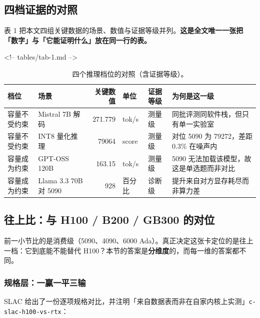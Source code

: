 \subsection{四档证据的对照}

表 1 把本文四组关键数据的场景、数值与证据等级并列。\textbf{这是全文唯一一张把「数字」与「它能证明什么」放在同一行的表。}


<!-- tables/tab-1.md -->

\begin{table}[t]
\centering
\footnotesize
\setlength{\tabcolsep}{4pt}
\caption{四个推理档位的对照（含证据等级）。}
\label{tab:6}
\begin{tabularx}{\textwidth}{llrllX}
\toprule
档位 & 场景 & 关键数值 & 单位 & 证据等级 & 为何是这一级 \\
\midrule
容量不受约束 & Mistral 7B 解码 & 271.779 & tok/s & 测量级 & 同批评测同软件栈，但只有单一实验室 \\
容量不受约束 & INT8 量化推理 & 79064 & score & 测量级 & 对位 5090 为 79272，差距 0.3\% 在噪声内 \\
容量成为约束 & GPT-OSS 120B & 163.15 & tok/s & 测量级 & 5090 无法加载该模型，故这是单选题而非对比 \\
容量成为约束 & Llama 3.3 70B 对 5090 & 928 & 百分比 & 诊断级 & 提升来自对方显存耗尽而非算力差 \\
\bottomrule
\end{tabularx}
\end{table}


\subsection{往上比：与 H100 / B200 / GB300 的对位}

前一小节比的是消费级（5090、4090、6000 Ada）。真正决定这张卡定位的是往上一档：它到底能不能替代 H100？本节的答案是\textbf{分维度}的，而每一维的答案都不同。


\subsubsection{规格层：一赢一平三输}

SLAC 给出了一份逐项规格对比，并注明「来自数据表而非在自家内核上实测」{\scriptsize\texttt{c-\hspace{0pt}slac-\hspace{0pt}h100-\hspace{0pt}vs-\hspace{0pt}rtx}}：


